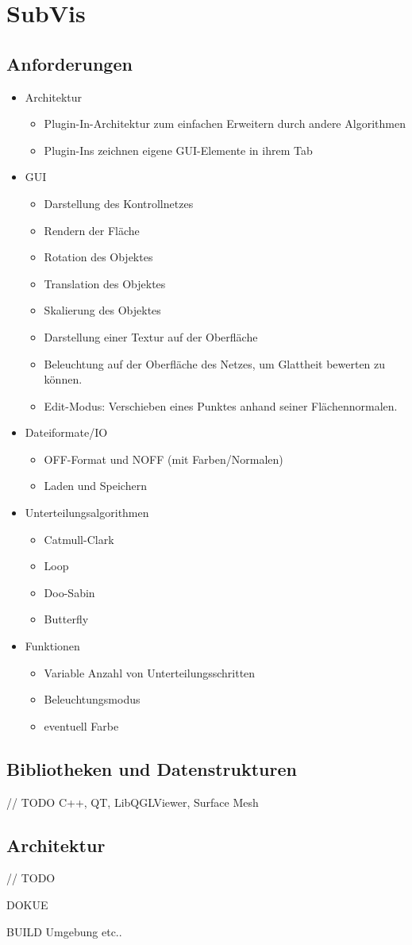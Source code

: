\chapter{SubVis}


\section{Anforderungen}

\begin{itemize}
 \item Architektur
 \begin{itemize}
 	\item Plugin-In-Architektur zum einfachen Erweitern durch andere Algorithmen
 	\item Plugin-Ins zeichnen eigene GUI-Elemente in ihrem Tab
 \end{itemize}
 \item GUI
  \begin{itemize}
 	\item Darstellung des Kontrollnetzes
 	\item Rendern der Fläche
 	\item Rotation des Objektes 
 	\item Translation des Objektes
 	\item Skalierung des Objektes
 	\item Darstellung einer Textur auf der Oberfläche
 	\item Beleuchtung auf der Oberfläche des Netzes, um Glattheit bewerten zu können.
 	\item Edit-Modus: Verschieben eines Punktes anhand seiner Flächennormalen.
 \end{itemize}
 \item Dateiformate/IO
 \begin{itemize}
 	\item OFF-Format und NOFF (mit Farben/Normalen)
 	\item Laden und Speichern
 \end{itemize}
 \item Unterteilungsalgorithmen
 \begin{itemize}
 	\item Catmull-Clark
 	\item Loop
 	\item Doo-Sabin
 	\item Butterfly
 \end{itemize}
 \item Funktionen
 \begin{itemize}
  \item Variable Anzahl von Unterteilungsschritten
  \item Beleuchtungsmodus
  \item eventuell Farbe
 \end{itemize}
\end{itemize}

\section{Bibliotheken und Datenstrukturen}

// TODO C++, QT, LibQGLViewer, Surface Mesh

\section{Architektur}

// TODO

DOKUE

BUILD Umgebung etc..

